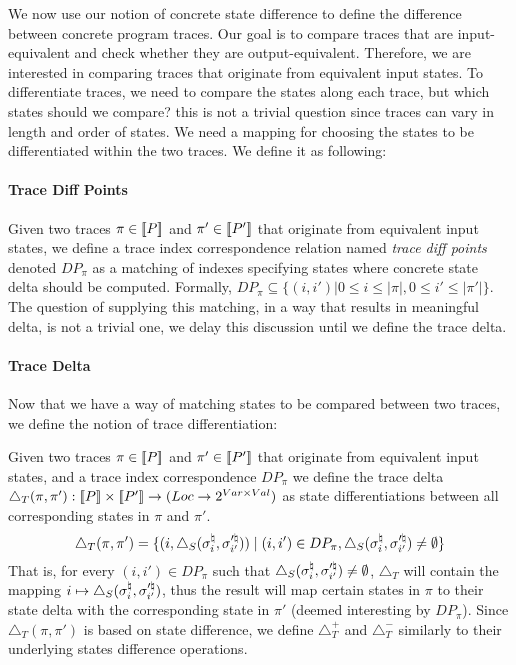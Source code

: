We now use our notion of concrete state difference to define the difference between concrete program traces. Our goal is to compare traces that are input-equivalent and check whether they are output-equivalent.
Therefore, we are interested in comparing traces that originate from equivalent input states. To differentiate traces, we need to compare the states along each trace, but which states should we compare? this is not a trivial question since traces can vary in length and order of states. We need a mapping for choosing the states to be differentiated within the two traces. We define it as following:


\paragraph{Trace Diff Points} 
Given two traces $\pi \in \lbrack\!\lbrack P \rbrack\!\rbrack$ and $\pi' \in \lbrack\!\lbrack P' \rbrack\!\rbrack$ that originate from equivalent input states, we define a trace index correspondence relation named \emph{trace diff points} denoted $DP_{\pi}$ as a matching of indexes specifying states where concrete state delta should be computed. Formally,
$DP_{\pi} \subseteq \{(i,i')| 0 \leq i \leq |\pi|, 0 \leq i' \leq |\pi'|\}$. The question of supplying this matching, in a way that results in meaningful delta, is not a trivial one, we delay this discussion until we define the trace delta.

\paragraph{Trace Delta}
Now that we have a way of matching states to be compared between two traces, we define the notion of trace differentiation:
\begin{definition}
Given two traces $\pi \in \lbrack\!\lbrack P \rbrack\!\rbrack$ and $\pi' \in \lbrack\!\lbrack P' \rbrack\!\rbrack$ that originate from equivalent input states, and a trace index correspondence $DP_{\pi}$ we define the trace delta $\triangle_{T}(\pi,\pi') : \lbrack\!\lbrack P \rbrack\!\rbrack \times \lbrack\!\lbrack P' \rbrack\!\rbrack \rightarrow (Loc \rightarrow 2^{Var \times Val})$ as state differentiations between all corresponding states in $\pi$ and $\pi'$.
\[
\triangle_{T}(\pi,\pi') = \{ (i,\triangle_{S}(\sigma^\natural_{i},\sigma'^\natural_{i'})) \mid (i,i') \in DP_{\pi}, \triangle_{S}(\sigma^\natural_{i},\sigma'^\natural_{i'}) \neq \emptyset \}
\]
That is, for every $(i,i') \in DP_{\pi}$ such that $\triangle_{S}(\sigma^\natural_{i},\sigma'^\natural_{i'}) \neq \emptyset$, $\triangle_{T}$ will contain the mapping $i \mapsto \triangle_{S}(\sigma^\natural_{i},\sigma'^\natural_{i'})$, thus the result will map certain states in $\pi$ to their state delta with the corresponding state in $\pi'$ (deemed interesting by $DP_{\pi}$). Since $\triangle_{T}(\pi,\pi')$ is based on state difference, we define $\triangle_{T}^{+}$ and $\triangle_{T}^{-}$ similarly to their underlying states difference operations.
\end{definition}

